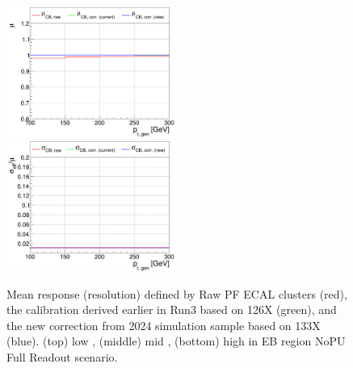 \begin{figure}
\includegraphics[width=0.495\textwidth]{./plots_pdf/ECAL_plots/plotsNOPU/EB/FULL/pdf/GENPT/EBFULL_GENPT_0100_0300_MuOverBins.pdf}
\includegraphics[width=0.495\textwidth]{./plots_pdf/ECAL_plots/plotsNOPU/EB/FULL/pdf/GENPT/EBFULL_GENPT_0100_0300_EffSigmaOverBins.pdf}

\caption [$\mu$ ($\sigma_\mathrm{eff}$) vs \pt of PF ECAL cluster - EB full readout NoPU scenario.]{Mean response (resolution) defined by Raw PF ECAL clusters (red), the calibration derived earlier in Run3 based on 126X (green), and the new correction from 2024 simulation sample based on 133X (blue). (top) low \pt, (middle) mid \pt, (bottom) high \pt in EB region NoPU Full Readout scenario.}
\label{fig:NOPU_EBFULL_pt}
\end{figure}




